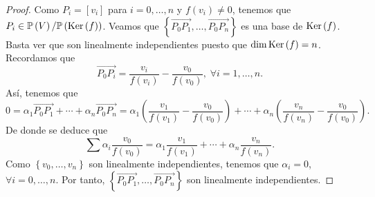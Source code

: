 \begin{proof}
	Como $\displaystyle P_{i} = [v_{i}] $ para $\displaystyle i = 0, \ldots,n $ y $\displaystyle f\left(v_{i}\right) \neq 0 $, tenemos que $\displaystyle P_{i} \in \mathbb{P}\left(V\right) / \mathbb{P}\left(\operatorname{Ker}\left(f\right)\right) $. Veamos que $\displaystyle \left\{ \overrightarrow{P_{0}P_{1}}, \ldots, \overrightarrow{P_{0} P_{n}}\right\}  $ es una base de $\displaystyle \operatorname{Ker}\left(f\right) $. 
	Basta ver que son linealmente independientes puesto que $\displaystyle \dim \operatorname{Ker}\left(f\right) = n $. Recordamos que
	\[\overrightarrow{P_{0}P_{i}} = \frac{v_{i}}{f\left(v_{i}\right)} - \frac{v_{0}}{f\left(v_{0}\right)}, \; \forall i = 1, \ldots, n .\]
	Así, tenemos que 
	\[0 = \alpha_{1}\overrightarrow{P_{0}P_{1}} + \cdots + \alpha_{n}\overrightarrow{P_{0}P_{n}} = \alpha_{1}\left(\frac{v_{1}}{f\left(v_{1}\right)}-\frac{v_{0}}{f\left(v_{0}\right)}\right) + \cdots + \alpha_{n}\left(\frac{v_{n}}{f\left(v_{n}\right)}-\frac{v_{0}}{f\left(v_{0}\right)}\right) .\]
	De donde se deduce que
	\[\sum\alpha_{i}\frac{v_{0}}{f\left(v_{0}\right)} = \alpha_{1}\frac{v_{1}}{f\left(v_{1}\right)}+ \cdots + \alpha_{n}\frac{v_{n}}{f\left(v_{n}\right)} .\]
	Como $\displaystyle \left\{ v_{0}, \ldots, v_{n}\right\}  $ son linealmente independientes, tenemos que $\displaystyle \alpha_{i} = 0 $, $\displaystyle \forall i = 0, \ldots, n $. Por tanto, $\displaystyle \left\{ \overrightarrow{P_{0}P_{1}}, \ldots, \overrightarrow{P_{0}P_{n}}\right\}  $ son linealmente independientes.
\end{proof}


